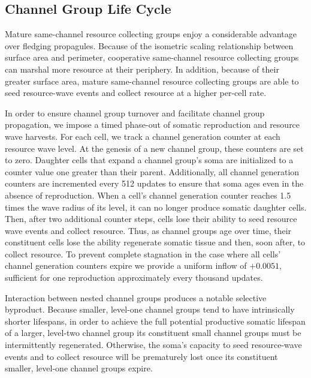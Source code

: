 \subsection{Channel Group Life Cycle} \label{sup:channel_group_life_cycle}

Mature same-channel resource collecting groups enjoy a considerable advantage over fledging propagules.
Because of the isometric scaling relationship between surface area and perimeter, cooperative same-channel resource collecting groups can marshal more resource at their periphery.
In addition, because of their greater surface area, mature same-channel resource collecting groups are able to seed resource-wave events and collect resource at a higher per-cell rate.

In order to ensure channel group turnover and facilitate channel group propagation, we impose a timed phase-out of somatic reproduction and resource wave harvests.
For each cell, we track a channel generation counter at each resource wave level.
At the genesis of a new channel group, these counters are set to zero.
Daughter cells that expand a channel group's soma are initialized to a counter value one greater than their parent.
Additionally, all channel generation counters are incremented every 512 updates to ensure that soma ages even in the absence of reproduction.
When a cell's channel generation counter reaches 1.5 times the wave radius of its level, it can no longer produce somatic daughter cells.
Then, after two additional counter steps, cells lose their ability to seed resource wave events and collect resource.
Thus, as channel groups age over time, their constituent cells lose the ability regenerate somatic tissue and then, soon after, to collect resource.
To prevent complete stagnation in the case where all cells' channel generation counters expire we provide a uniform inflow of $+0.0051$, sufficient for one reproduction approximately every thousand updates.

Interaction between nested channel groups produces a notable selective byproduct.
Because smaller, level-one channel groups tend to have intrinsically shorter lifespans, in order to achieve the full potential productive somatic lifespan of a larger, level-two channel group its constituent small channel groups must be intermittently regenerated.
Otherwise, the soma's capacity to seed resource-wave events and to collect resource will be prematurely lost once its constituent smaller, level-one channel groups expire.

